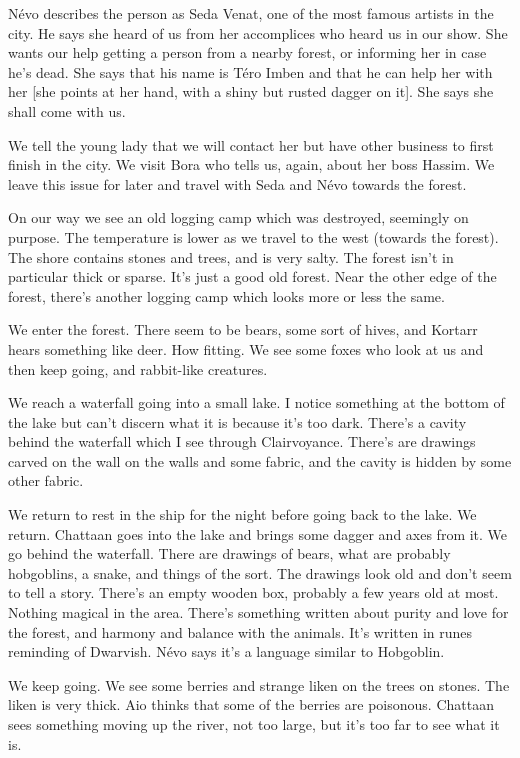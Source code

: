 \documentclass[10pt,a4paper,twoside,openany,hidelinks]{book}
\begin{document}
Névo describes the person as Seda Venat, one of the most famous artists in the city. He says she heard of us from her accomplices who heard us in our show. She wants our help getting a person from a nearby forest, or informing her in case he's dead.
She says that his name is Téro Imben and that he can help her with her [she points at her hand, with a shiny but rusted dagger on it]. She says she shall come with us.

We tell the young lady that we will contact her but have other business to first finish in the city. We visit Bora who tells us, again, about her boss Hassim.
We leave this issue for later and travel with Seda and Névo towards the forest.

On our way we see an old logging camp which was destroyed, seemingly on purpose. The temperature is lower as we travel to the west (towards the forest). The shore contains stones and trees, and is very salty. The forest isn't in particular thick or sparse. It's just a good old forest. Near the other edge of the forest, there's another logging camp which looks more or less the same.

We enter the forest. There seem to be bears, some sort of hives, and Kortarr hears something like deer. How fitting.  We see some foxes who look at us and then keep going, and rabbit-like creatures.

We reach a waterfall going into a small lake. I notice something at the bottom of the lake but can't discern what it is because it's too dark. There's a cavity behind the waterfall which I see through Clairvoyance. There's are drawings carved on the wall on the walls and some fabric, and the cavity is hidden by some other fabric.

We return to rest in the ship for the night before going back to the lake.
We return. Chattaan goes into the lake and brings some dagger and axes from it. We go behind the waterfall. There are drawings of bears, what are probably hobgoblins, a snake, and things of the sort. The drawings look old and don't seem to tell a story. There's an empty wooden box, probably a few years old at most. Nothing magical in the area.
There's something written about purity and love for the forest, and harmony and balance with the animals. It's written in runes reminding of Dwarvish. Névo says it's a language similar to Hobgoblin.

We keep going. We see some berries and strange liken on the trees on stones. The liken is very thick. Aio thinks that some of the berries are poisonous. Chattaan sees something moving up the river, not too large, but it's too far to see what it is.
\end{document}
